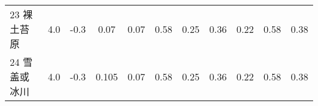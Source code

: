 \begin{sidewaystable}[]
\begin{tabular}{@{}lcccccccccc@{}}
        23 裸土苔原    & 4.0        & -0.3                                                                         & 0.07                                                                                                            & 0.07                                                                                                            & 0.58                                                                                                            & 0.25                                                                                                            & 0.36                                                                                                            & 0.22                                                                                                            & 0.58                                                                                                            & 0.38                                                                                                            \\
        24 雪盖或冰川   & 4.0        & -0.3                                                                         & 0.105                                                                                                           & 0.07                                                                                                            & 0.58                                                                                                            & 0.25                                                                                                            & 0.36                                                                                                            & 0.22                                                                                                            & 0.58                                                                                                            & 0.38                                                                                                            \\\bottomrule
                \end{tabular}
\end{sidewaystable}



